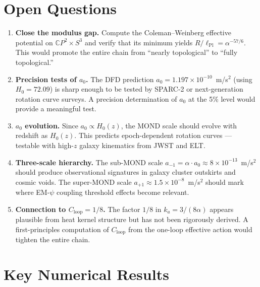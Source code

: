 \documentclass[12pt,a4paper]{article}
\newcommand{\CP}{\mathbb{C}P}
\newcommand{\Hzero}{H_0}
\newcommand{\ee}[1]{\times 10^{#1}}
\begin{document}
\section{Open Questions}
\label{sec:open}

\begin{enumerate}
\item \textbf{Close the modulus gap.} Compute the Coleman--Weinberg effective
  potential on $\CP^2 \times S^3$ and verify that its minimum yields
  $R/\ell_{\mathrm{Pl}} = \alpha^{-57/6}$. This would promote the entire
  chain from ``nearly topological'' to ``fully topological.''

\item \textbf{Precision tests of $a_0$.} The DFD prediction
  $a_0 = 1.197 \ee{-10}$~m/s$^2$ (using $\Hzero = 72.09$) is sharp enough
  to be tested by SPARC-2 or next-generation rotation curve surveys.
  A precision determination of $a_0$ at the 5\% level would provide a
  meaningful test.

\item \textbf{$a_0$ evolution.} Since $a_0 \propto \Hzero(z)$, the MOND
  scale should evolve with redshift as $\Hzero(z)$. This predicts
  epoch-dependent rotation curves --- testable with high-$z$ galaxy
  kinematics from JWST and ELT.

\item \textbf{Three-scale hierarchy.} The sub-MOND scale
  $a_{-1} = \alpha \cdot a_0 \approx 8 \ee{-13}$~m/s$^2$ should produce
  observational signatures in galaxy cluster outskirts and cosmic voids.
  The super-MOND scale $a_{+1} \approx 1.5 \ee{-8}$~m/s$^2$ should mark
  where EM-$\psi$ coupling threshold effects become relevant.

\item \textbf{Connection to $C_{\mathrm{loop}} = 1/8$.} The factor $1/8$
  in $k_a = 3/(8\alpha)$ appears plausible from heat kernel structure but
  has not been rigorously derived. A first-principles computation of
  $C_{\mathrm{loop}}$ from the one-loop effective action would tighten the
  entire chain.
\end{enumerate}

\section{Key Numerical Results}
\label{sec:numerics}
\end{document}
